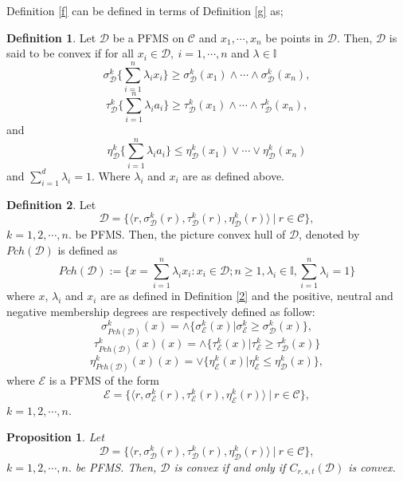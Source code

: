 \documentclass[12pt,letterpaper]{amsart}
\theoremstyle{plain}
\newtheorem{proposition}{Proposition}[section]
\theoremstyle{definition}
\newtheorem{definition}{Definition}[section]
\numberwithin{equation}{section}
\begin{document}
\noindent Definition \ref{f} can be defined in terms of Definition \ref{g} as;

\begin{definition} 
Let $\mathcal{D}$ be a PFMS on $\mathcal{C}$ and $x_1, \cdots, x_{n}$ be points in $\mathcal{D}$. Then, $\mathcal{D}$ is said to be convex if for all $x_{i} \in \mathcal{D},~ i = 1, \cdots, n$ and $\lambda \in \mathbb{I}$ $$\sigma^k_\mathcal{D} \{ \sum \limits_{i=1}^{n} \lambda_{i} x_i \} \geq \sigma^k_{\mathcal{D}}(x_1) \wedge \cdots \wedge \sigma^k_{\mathcal{D}}(x_n),$$ $$\tau^k_\mathcal{D} \{ \sum \limits_{i=1}^{n} \lambda_{i} a_i \} \geq \tau^k_{\mathcal{D}}(x_1) \wedge \cdots \wedge \tau^k_{\mathcal{D}}(x_n),$$ and $$\eta^k_\mathcal{D} \{ \sum \limits_{i=1}^{n} \lambda_{i} a_i \} \leq \eta^k_{\mathcal{D}}(x_1) \vee \cdots \vee \eta^k_{\mathcal{D}}(x_n)$$ and $\sum \limits_{i=1}^{d} \lambda_i = 1$. Where $\lambda_i$ and $x_i$ are as defined above.
\end{definition}

\begin{definition} 
Let $$\mathcal{D} = \lbrace \langle r, \sigma^{k}_{\mathcal{D}}(r), \tau^{k}_{\mathcal{D}}(r), \eta^{k}_{\mathcal{D}}(r)   \rangle~ |~ r \in \mathcal{C}  \rbrace,$$ $k = 1, 2, \cdots, n.$ be PFMS. Then, the picture convex hull of $\mathcal{D}$, denoted by $Pch(\mathcal{D})$ is defined as $$Pch(\mathcal{D}):= \lbrace x = \sum \limits_{i=1}^{n} \lambda_{i} x_i : x_{i} \in \mathcal{D}; n \geq 1, \lambda_{i} \in \mathbb{I}, \sum \limits_{i=1}^{n} \lambda_{i} = 1 \rbrace$$ where $x$, $\lambda_i$ and $x_i$ are as defined in Definition \ref{2} and the positive, neutral and negative membership degrees are respectively defined as follow: $$\sigma^k_{Pch(\mathcal{D})}(x) = \wedge \lbrace \sigma^k_{\mathcal{E}}(x) | \sigma^k_{\mathcal{E}} \geq \sigma^k_{\mathcal{D}}(x)\rbrace,$$ $$\tau^k_{Pch(\mathcal{D})}(x)(x) = \wedge \lbrace \tau^k_{\mathcal{E}}(x) | \tau^k_{\mathcal{E}} \geq \tau^k_{\mathcal{D}}(x)\rbrace$$ $$\eta^k_{Pch(\mathcal{D})}(x)(x) = \vee \lbrace \eta^k_{\mathcal{E}}(x) | \eta^k_{\mathcal{E}} \leq \eta^k_{\mathcal{D}}(x)\rbrace,$$ where $\mathcal{\mathcal{E}}$ is a PFMS of the form $$\mathcal{E} = \lbrace \langle r, \sigma^{k}_{\mathcal{E}}(r), \tau^{k}_{\mathcal{E}}(r), \eta^{k}_{\mathcal{E}}(r)   \rangle~ |~ r \in \mathcal{C}  \rbrace,$$ $k = 1, 2, \cdots, n.$  
\end{definition}

\begin{proposition} \label{h} 
Let $$\mathcal{D} = \lbrace \langle r, \sigma^{k}_{\mathcal{D}}(r), \tau^{k}_{\mathcal{D}}(r), \eta^{k}_{\mathcal{D}}(r)   \rangle~ |~ r \in \mathcal{C}  \rbrace,$$ $k = 1, 2, \cdots, n.$ be PFMS. Then, $\mathcal{D}$ is convex if and only if $C_{r, s, t} (\mathcal{D})$ is convex.
\end{proposition}
\end{document}

